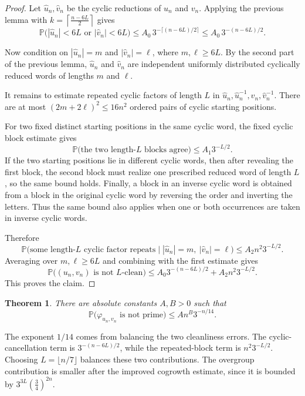 \documentclass{amsproc}
\newtheorem{theorem}{Theorem}[section]
\newcommand{\Prob}{\mathbb P}
\begin{document}
\begin{proof}
Let $\widehat u_n,\widehat v_n$ 
be the cyclic reductions of $u_n$ and $v_n$.  Applying the previous lemma with
$k=\left\lceil \frac{n-6L}{2}\right\rceil$ gives
\[
        \Prob\bigl(|\widehat u_n|<6L\text{ or }|\widehat v_n|<6L\bigr)
        \leq A_0\,3^{-\lceil (n-6L)/2\rceil}
        \leq A_0\,3^{-(n-6L)/2}.
\]

Now condition on $|\widehat u_n|=m$ and $|\widehat v_n|=\ell$, 
where $m,\ell\geq 6L$.  By the second part of the previous lemma,
$\widehat u_n$ and $\widehat v_n$ are independent uniformly distributed
cyclically reduced words of lengths $m$ and $\ell$.

It remains to estimate repeated cyclic factors of length $L$ in
$\widehat u_n,\widehat u_n^{-1},\widehat v_n,\widehat v_n^{-1}$.  There are at
most $(2m+2\ell)^2\leq 16n^2$ ordered pairs of cyclic starting positions.

For two fixed distinct starting positions in the same cyclic word, the fixed
cyclic block estimate gives
\[
        \Prob\bigl(\text{the two length-}L\text{ blocks agree}\bigr)
        \leq A_1 3^{-L/2}.
\]
If the two starting positions lie in different cyclic words, then after
revealing the first block, the second block must realize one prescribed reduced
word of length $L$, so the same bound holds.  Finally, a block in an inverse
cyclic word is obtained from a block in the original cyclic word by reversing
the order and inverting the letters.  Thus the same bound also applies when one
or both occurrences are taken in inverse cyclic words.

Therefore
\[
        \Prob\bigl(\text{some length-}L\text{ cyclic factor repeats}
        \mid |\widehat u_n|=m,\ |\widehat v_n|=\ell\bigr)
        \leq A_2 n^2 3^{-L/2}.
\]
Averaging over $m,\ell\geq 6L$ and combining with the first estimate gives
\[
        \Prob\bigl((u_n,v_n)\text{ is not }L\text{-clean}\bigr)
        \leq A_0 3^{-(n-6L)/2}+A_2 n^2 3^{-L/2}.
\]
This proves the claim.
\end{proof}

\begin{theorem}\label{T.sphere}\label{thm:sphere-prime}
There are absolute constants $A,B>0$ such that
\[
        \Prob\bigl(\varphi_{u_n,v_n}\text{ is not prime}\bigr)
        \leq An^B 3^{-n/14}.
\]
\end{theorem}

The exponent $1/14$ comes from balancing the two cleanliness errors.  The
cyclic-cancellation term is $3^{-(n-6L)/2}$, while the repeated-block term is
$n^2 3^{-L/2}$.  Choosing $L=\lfloor n/7\rfloor$ balances these two
contributions.  The overgroup contribution is smaller after the improved
cogrowth estimate, since it is bounded by
$
        3^{3L}\left(\frac34\right)^{2n}.
$
\end{document}
